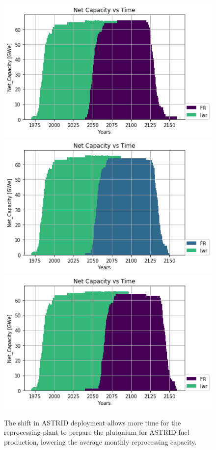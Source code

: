 \begin{figure}[htbp!]
    \begin{center}
        \includegraphics[height=0.25\textheight]{./images/sensitivity/5.png}
        \includegraphics[height=0.25\textheight]{./images/sensitivity/10.png}
        \includegraphics[height=0.25\textheight]{./images/sensitivity/20.png}
    \end{center}
    \caption{The shift in \gls{ASTRID} deployment allows more time for the reprocessing
             plant to prepare the plutonium for \gls{ASTRID} fuel production, lowering
             the average monthly reprocessing capacity.}
    \label{fig:ext}
\end{figure}

